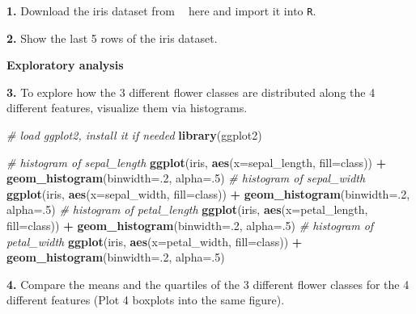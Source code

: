 \documentclass[]{book}
\newenvironment{Shaded}{\begin{snugshade}}{\end{snugshade}}
\newcommand{\KeywordTok}[1]{\textcolor[rgb]{0.13,0.29,0.53}{\textbf{#1}}}
\newcommand{\DataTypeTok}[1]{\textcolor[rgb]{0.13,0.29,0.53}{#1}}
\newcommand{\DecValTok}[1]{\textcolor[rgb]{0.00,0.00,0.81}{#1}}
\newcommand{\StringTok}[1]{\textcolor[rgb]{0.31,0.60,0.02}{#1}}
\newcommand{\CommentTok}[1]{\textcolor[rgb]{0.56,0.35,0.01}{\textit{#1}}}
\newcommand{\OperatorTok}[1]{\textcolor[rgb]{0.81,0.36,0.00}{\textbf{#1}}}
\newcommand{\NormalTok}[1]{#1}
\begin{document}
\textbf{1.} Download the iris dataset from
\textcolor{white}{[}\faTable\textcolor{white}{]} here and import it into
\texttt{R}.

\textbf{2.} Show the last 5 rows of the iris dataset.

\textbf{Exploratory analysis}

\textbf{3.} To explore how the 3 different flower classes are
distributed along the 4 different features, visualize them via
histograms.

\begin{Shaded}
\begin{Highlighting}[]
\CommentTok{# load ggplot2, install it if needed}
\KeywordTok{library}\NormalTok{(ggplot2)}

\CommentTok{# histogram of sepal_length}
\KeywordTok{ggplot}\NormalTok{(iris, }\KeywordTok{aes}\NormalTok{(}\DataTypeTok{x=}\NormalTok{sepal_length, }\DataTypeTok{fill=}\NormalTok{class)) }\OperatorTok{+}
\StringTok{  }\KeywordTok{geom_histogram}\NormalTok{(}\DataTypeTok{binwidth=}\NormalTok{.}\DecValTok{2}\NormalTok{, }\DataTypeTok{alpha=}\NormalTok{.}\DecValTok{5}\NormalTok{)}
\CommentTok{# histogram of sepal_width}
\KeywordTok{ggplot}\NormalTok{(iris, }\KeywordTok{aes}\NormalTok{(}\DataTypeTok{x=}\NormalTok{sepal_width, }\DataTypeTok{fill=}\NormalTok{class)) }\OperatorTok{+}
\StringTok{  }\KeywordTok{geom_histogram}\NormalTok{(}\DataTypeTok{binwidth=}\NormalTok{.}\DecValTok{2}\NormalTok{, }\DataTypeTok{alpha=}\NormalTok{.}\DecValTok{5}\NormalTok{)}
\CommentTok{# histogram of petal_length}
\KeywordTok{ggplot}\NormalTok{(iris, }\KeywordTok{aes}\NormalTok{(}\DataTypeTok{x=}\NormalTok{petal_length, }\DataTypeTok{fill=}\NormalTok{class)) }\OperatorTok{+}
\StringTok{  }\KeywordTok{geom_histogram}\NormalTok{(}\DataTypeTok{binwidth=}\NormalTok{.}\DecValTok{2}\NormalTok{, }\DataTypeTok{alpha=}\NormalTok{.}\DecValTok{5}\NormalTok{)}
\CommentTok{# histogram of petal_width}
\KeywordTok{ggplot}\NormalTok{(iris, }\KeywordTok{aes}\NormalTok{(}\DataTypeTok{x=}\NormalTok{petal_width, }\DataTypeTok{fill=}\NormalTok{class)) }\OperatorTok{+}
\StringTok{  }\KeywordTok{geom_histogram}\NormalTok{(}\DataTypeTok{binwidth=}\NormalTok{.}\DecValTok{2}\NormalTok{, }\DataTypeTok{alpha=}\NormalTok{.}\DecValTok{5}\NormalTok{)}
\end{Highlighting}
\end{Shaded}

\textbf{4.} Compare the means and the quartiles of the 3 different
flower classes for the 4 different features (Plot 4 boxplots into the
same figure).
\end{document}
